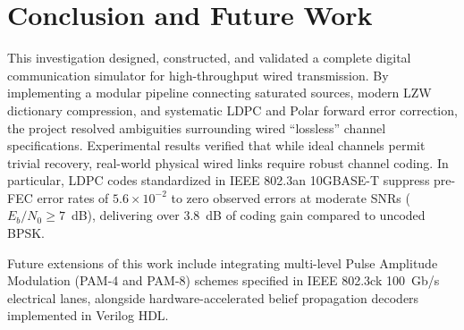 \documentclass[conference]{IEEEtran}
\begin{document}
\section{Conclusion and Future Work}
This investigation designed, constructed, and validated a complete digital communication simulator for high-throughput wired transmission. By implementing a modular pipeline connecting saturated sources, modern LZW dictionary compression, and systematic LDPC and Polar forward error correction, the project resolved ambiguities surrounding wired ``lossless'' channel specifications. Experimental results verified that while ideal channels permit trivial recovery, real-world physical wired links require robust channel coding. In particular, LDPC codes standardized in IEEE 802.3an 10GBASE-T suppress pre-FEC error rates of $5.6 \times 10^{-2}$ to zero observed errors at moderate SNRs ($E_b/N_0 \ge 7$~dB), delivering over 3.8~dB of coding gain compared to uncoded BPSK.

Future extensions of this work include integrating multi-level Pulse Amplitude Modulation (PAM-4 and PAM-8) schemes specified in IEEE 802.3ck 100~Gb/s electrical lanes, alongside hardware-accelerated belief propagation decoders implemented in Verilog HDL.
\end{document}
